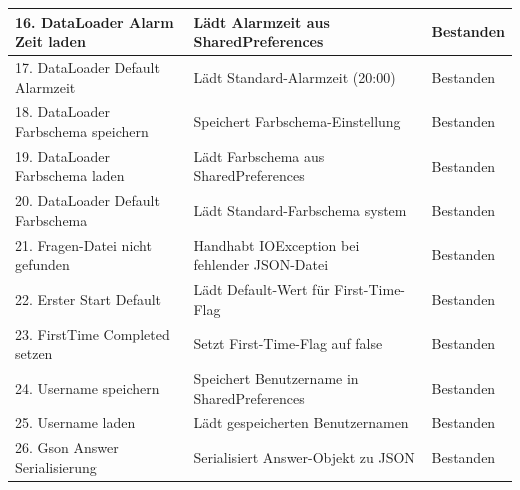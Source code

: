 \begin{tabularx}{\textwidth}{|l|X|l|}
\hline
16. DataLoader Alarm Zeit laden & Lädt Alarmzeit aus SharedPreferences & Bestanden\\
\hline
17. DataLoader Default Alarmzeit & Lädt Standard-Alarmzeit (20:00) & Bestanden\\
\hline
18. DataLoader Farbschema speichern & Speichert Farbschema-Einstellung & Bestanden\\
\hline
19. DataLoader Farbschema laden & Lädt Farbschema aus SharedPreferences & Bestanden\\
\hline
20. DataLoader Default Farbschema & Lädt Standard-Farbschema system & Bestanden\\
\hline
21. Fragen-Datei nicht gefunden & Handhabt IOException bei fehlender JSON-Datei & Bestanden\\
\hline
22. Erster Start Default & Lädt Default-Wert für First-Time-Flag & Bestanden\\
\hline
23. FirstTime Completed setzen & Setzt First-Time-Flag auf false & Bestanden\\
\hline
24. Username speichern & Speichert Benutzername in SharedPreferences & Bestanden\\
\hline
25. Username laden & Lädt gespeicherten Benutzernamen & Bestanden\\
\hline
26. Gson Answer Serialisierung & Serialisiert Answer-Objekt zu JSON & Bestanden\\
\hline
\end{tabularx}

